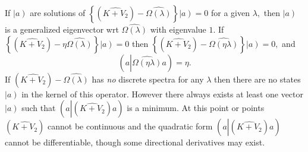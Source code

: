 \documentclass[aps,preprint]{revtex4}%
\begin{document}
If $\left\vert \overset{}{a}\right)  $ are solutions of $\left\{  \left(
\widehat{K+V_{2}}\right)  -\widehat{\Omega\left(  \lambda\right)  }\right\}
\left\vert \overset{}{a}\right)  =0$ for a given $\lambda,$ then $\left\vert
\overset{}{a}\right)  $ is a generalized eigenvector wrt $\widehat
{\Omega\left(  \lambda\right)  }$ with eigenvalue $1.$ If $\left\{  \left(
\widehat{K+V_{2}}\right)  -\eta\widehat{\Omega\left(  \lambda\right)
}\right\}  \left\vert \overset{}{a}\right)  =0$ then $\left\{  \left(
\widehat{K+V_{2}}\right)  -\widehat{\Omega\left(  \eta\lambda\right)
}\right\}  \left\vert \overset{}{a}\right)  =0,$ and
\begin{equation}
\left(  a\left\vert \widehat{\Omega\left(  \eta\lambda\right)  }\right.
a\right)  =\eta.
\end{equation}
If $\left(  \widehat{K+V_{2}}\right)  -\widehat{\Omega\left(  \lambda\right)
}$ has \emph{no} discrete spectra for any $\lambda$ then there are no states
$\left\vert \overset{}{a}\right)  $ in the kernel of this operator. However
there always exists at least one vector $\left\vert \overset{}{a}\right)  $
such that $\left(  a\left\vert \left(  \widehat{K+V_{2}}\right)  \right.
a\right)  $ is a minimum. At this point or points $\left(  \widehat{K+V_{2}%
}\right)  $ cannot be continuous and the quadratic form $\left(  a\left\vert
\left(  \widehat{K+V_{2}}\right)  \right.  a\right)  $ cannot be
differentiable, though some directional derivatives may exist.
\end{document}

